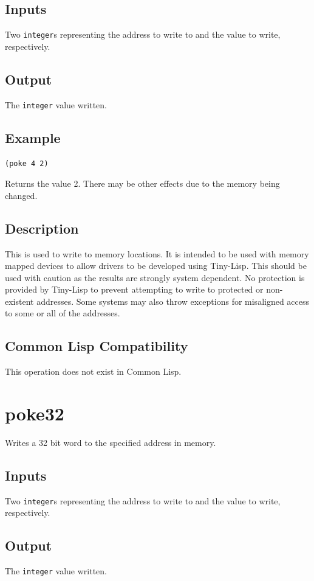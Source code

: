 \documentclass[10pt, openany]{book}
\newcommand{\datatype}[1]{\texttt{#1}}
\newcommand{\tl}{Tiny-Lisp}
\newcommand{\cl}{Common Lisp}
\begin{document}
\subsection{Inputs}
Two \datatype{integer}s representing the address to write to and the value to write, respectively.
\subsection{Output}
The \datatype{integer} value written.
\subsection{Example}
\begin{lstlisting}
(poke 4 2)
\end{lstlisting}
Returns the value 2.  There may be other effects due to the memory being changed.
\subsection{Description}
This is used to write to memory locations.  It is intended to be used with memory mapped devices to allow drivers to be developed using \tl{}.  This should be used with caution as the results are strongly system dependent.  No protection is provided by \tl{} to prevent attempting to write to protected or non-existent addresses.  Some systems may also throw exceptions for misaligned access to some or all of the addresses.
\subsection{Common Lisp Compatibility}
This operation does not exist in \cl.

\section{poke32}
Writes a 32 bit word to the specified address in memory.
\subsection{Inputs}
Two \datatype{integer}s representing the address to write to and the value to write, respectively.
\subsection{Output}
The \datatype{integer} value written.
\end{document}
